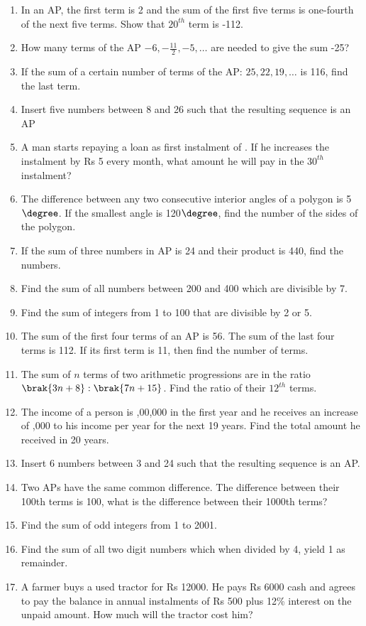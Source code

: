 \begin{enumerate}[label=\thesubsection.\arabic*, ref=\thesubsection.\theenumi]
\item In an AP,  the first term is 2 and the sum of the first five terms is one-fourth of the next five terms. Show that $20^{th}$ term is -112.
\item How many terms of the AP  $-6, -\frac{11}{2},  -5, \dots $ are needed to give the sum -25?
\item  If the sum of a certain number of terms of the AP: $25,  22,  19,  \dots $  is 116, find the last term.
\item Insert five numbers between 8 and 26 such that the resulting sequence is an AP
\item A man starts repaying a loan as first instalment of . If he increases the
instalment by Rs 5 every month,  what amount he will pay in the $30^{th}$ instalment?
\item The difference between any two consecutive interior angles of a polygon is 5$\degree$. If the smallest angle is 120$\degree$,  find the number of the sides of the polygon. 
\item If the sum of three numbers in AP  is 24 and their product is 440,  find the numbers.
\item Find the sum of all numbers between 200 and 400 which are divisible by 7.
\item Find the sum of integers from 1 to 100 that are divisible by 2 or 5.
\item  The sum of the first four terms of an AP  is 56. The sum of the last four terms is 112. If its first term is 11, then find the number of terms.
\item The sum of $n$ terms of two arithmetic progressions are in the ratio
	$\brak {3n+8}:\brak {7n+15}$.  Find the ratio of their $12^{th}$ terms.
\item The income of a person is ,00,000 in the first year and he receives an increase of ,000 to his income per year for the next 19 years.  Find the total amount he received in 20 years.
\item Insert 6 numbers between 3 and 24 such that the resulting sequence is an AP.
\item Two APs have the same common difference. The difference between their 100th terms is 100,  what is the difference between their 1000th terms?
\item Find the sum of odd integers from 1 to 2001.
\item Find the sum of all two digit numbers which when divided by 4,  yield 1 as remainder.
\item A farmer buys a used tractor for Rs 12000. He pays Rs 6000 cash and agrees to pay the balance in annual instalments of Rs 500 plus 12\% interest on the unpaid amount. How much will the tractor cost him?

\end{enumerate}
